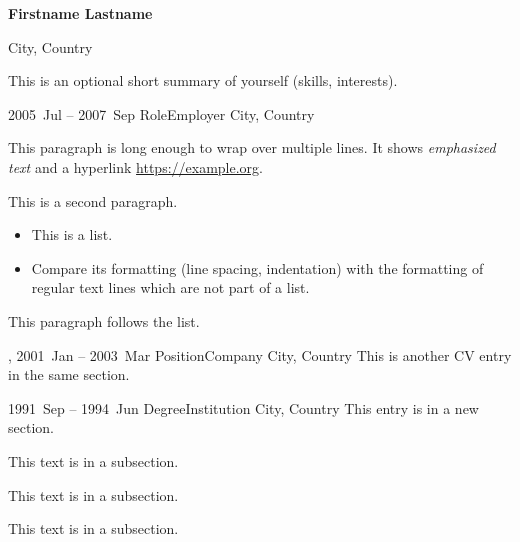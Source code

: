 \documentclass[a4paper]{article}
\begin{document}
\begin{center}
	\textbf{\large Firstname Lastname}

	City, Country

\end{center}

\begin{center}
	This is an optional short summary of yourself (skills, interests).
\end{center}




\entry
{2005~Jul -- 2007~Sep}
{Role}{Employer}
{City, Country}
{This paragraph is long enough to wrap over multiple lines.
It shows \emph{emphasized text} and a hyperlink \url{https://example.org}.

This is a second paragraph.

\begin{itemize}
	\item This is a list.
	\item Compare its formatting (line spacing, indentation)
		with the formatting of regular text lines
		which are not part of a list.
\end{itemize}

This paragraph follows the list.}

\sep
\entry
{2001~Jan -- 2003~Mar}
{Position}{Company}
{City, Country}
{This is another CV entry in the same section.}


\entry
{1991~Sep -- 1994~Jun}
{Degree}{Institution}
{City, Country}
{This entry is in a new section.}



This text is in a subsection.


This text is in a subsection.


This text is in a subsection.
\end{document}
